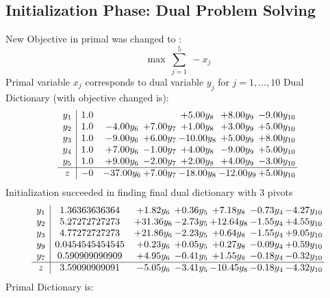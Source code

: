 \documentclass[8pt]{article}
\begin{document}
\subsection{Initialization Phase: Dual Problem Solving}
New Objective in primal was changed to : \[ \max\ \sum_{j=1}^{5}\ - x_j \] 
Primal variable $x_j$ corresponds to dual variable $y_j$ for $j = 1,\ldots,10$
Dual Dictionary (with objective changed is): 
\[\begin{array}{c| c c@{\hskip 2pt} c@{\hskip 2pt} c@{\hskip 2pt} c@{\hskip 2pt} c@{\hskip 2pt} }
 y_{1}   &  1.0  &    &   & +  5.00 y_{8} & +  8.00 y_{9} & -9.00 y_{10}\\
 y_{2}   &  1.0 & -4.00 y_{6} & +  7.00 y_{7} & +  1.00 y_{8} & +  3.00 y_{9} & +  5.00 y_{10}\\
 y_{3}   &  1.0 & -9.00 y_{6} & +  6.00 y_{7} & -10.00 y_{8} & +  5.00 y_{9} & +  8.00 y_{10}\\
 y_{4}   &  1.0 & +  7.00 y_{6} & -1.00 y_{7} & +  4.00 y_{8} & -9.00 y_{9} & +  5.00 y_{10}\\
 y_{5}   &  1.0 & +  9.00 y_{6} & -2.00 y_{7} & +  2.00 y_{8} & +  4.00 y_{9} & -3.00 y_{10}\\
\hline
z    &  -0 & -37.00 y_{6} & +  7.00 y_{7} & -18.00 y_{8} & -12.00 y_{9} & +  5.00 y_{10}\\
\end{array}\]
Initialization succeeded in finding final dual dictionary with 3 pivots
\[\begin{array}{c| c c@{\hskip 2pt} c@{\hskip 2pt} c@{\hskip 2pt} c@{\hskip 2pt} c@{\hskip 2pt} }
 y_{1}   &  1.36363636364 & +  1.82 y_{6} & +  0.36 y_{5} & +  7.18 y_{8} & -0.73 y_{4} & -4.27 y_{10}\\
 y_{2}   &  5.27272727273 & + 31.36 y_{6} & -2.73 y_{5} & + 12.64 y_{8} & -1.55 y_{4} & +  4.55 y_{10}\\
 y_{3}   &  4.77272727273 & + 21.86 y_{6} & -2.23 y_{5} & +  0.64 y_{8} & -1.55 y_{4} & +  9.05 y_{10}\\
 y_{9}   &  0.0454545454545 & +  0.23 y_{6} & +  0.05 y_{5} & +  0.27 y_{8} & -0.09 y_{4} & +  0.59 y_{10}\\
 y_{7}   &  0.590909090909 & +  4.95 y_{6} & -0.41 y_{5} & +  1.55 y_{8} & -0.18 y_{4} & -0.32 y_{10}\\
\hline
z    &  3.59090909091 & -5.05 y_{6} & -3.41 y_{5} & -10.45 y_{8} & -0.18 y_{4} & -4.32 y_{10}\\
\end{array}\]
Primal Dictionary is:
\end{document}
